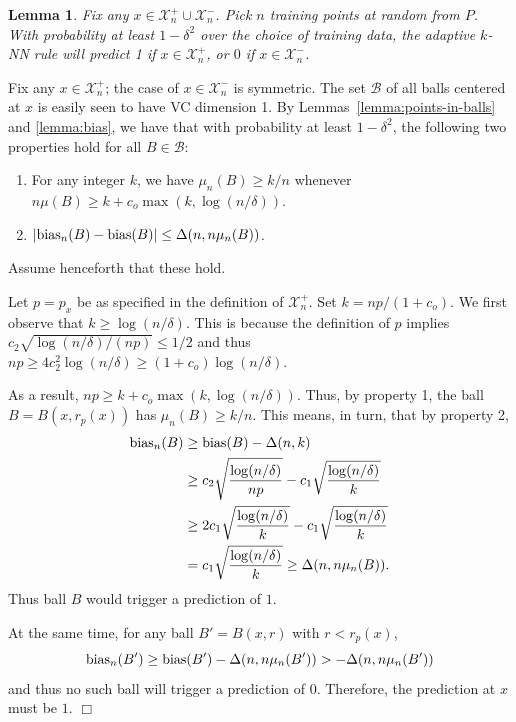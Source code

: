 \documentclass{article}
\def\X{{\mathcal X}}
\def\B{{\mathcal B}}
\def\bias{{\rm bias}}
\newtheorem{lemma}[thm]{Lemma}
\newenvironment{proof}{\noindent {\sc Proof:}}{$\Box$ \medskip}
\begin{document}
\begin{lemma}
Fix any $x \in \X^+_n \cup \X^-_n$. Pick $n$ training points at random from $P$. With probability at least $1-\delta^2$ over the choice of training data, the adaptive $k$-NN rule will predict 1 if $x \in \X^+_n$, or $0$ if $x \in \X^-_n$.
\label{lemma:good-sets}
\end{lemma}
\begin{proof}
Fix any $x \in \X^+_n$; the case of $x \in \X^-_n$ is symmetric. The set $\B$ of all balls centered at $x$ is easily seen to have VC dimension 1. By Lemmas~\ref{lemma:points-in-balls} and \ref{lemma:bias}, we have that with probability at least $1-\delta^2$, the following two properties hold for all $B \in \B$:
\begin{enumerate}
\item For any integer $k$, we have $\mu_n(B) \geq k/n$ whenever $n \mu(B) \geq k + c_o \max(k, \log (n/\delta))$.
\item $|\bias_n(B) - \bias(B)| \leq \Delta(n, n \mu_n(B))$.
\end{enumerate}
Assume henceforth that these hold.

Let $p = p_x$ be as specified in the definition of $\X^+_n$. Set $k = np/(1 + c_o)$. We first observe that $k \geq \log (n/\delta)$. This is because the definition of $p$ implies $c_2 \sqrt{\log (n/\delta)/(np)} \leq 1/2$ and thus $np \geq 4 c_2^2 \log (n/\delta) \geq (1+c_o) \log (n/\delta)$.

As a result, $np \geq k + c_o \max(k, \log (n/\delta))$. Thus, by property 1, the ball $B = B(x, r_p(x))$ has $\mu_n(B) \geq k/n$. This means, in turn, that by property 2,
\begin{align*}
\bias_n(B) &\geq \bias(B) - \Delta(n, k) \\
&\geq c_2 \sqrt{\frac{\log (n/\delta)}{np}} - c_1 \sqrt{\frac{\log (n/\delta)}{k}} \\
&\geq 2c_1 \sqrt{\frac{\log (n/\delta)}{k}} - c_1 \sqrt{\frac{\log (n/\delta)}{k}} \\
&= c_1 \sqrt{\frac{\log (n/\delta)}{k}} \geq \Delta(n, n \mu_n(B)) .
\end{align*}
Thus ball $B$ would trigger a prediction of $1$.

At the same time, for any ball $B' = B(x, r)$ with $r < r_p(x)$,
$$ \bias_n(B') \geq \bias(B') - \Delta(n, n \mu_n(B')) > -\Delta(n, n \mu_n(B')) $$
and thus no such ball will trigger a prediction of $0$. Therefore, the prediction at $x$ must be $1$.
\end{proof}
\end{document}

